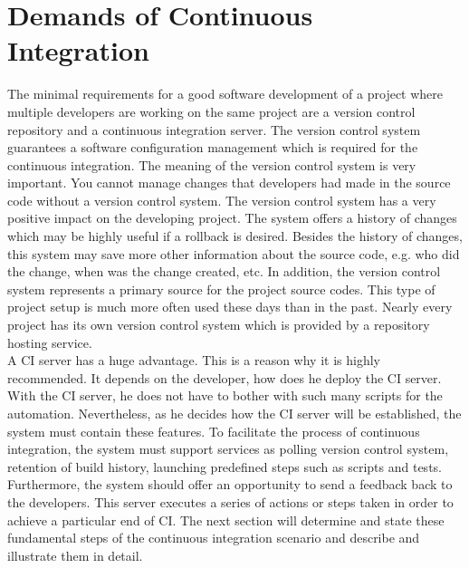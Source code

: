 \section{Demands of Continuous Integration}

The minimal requirements for a good software development of a project where multiple developers are working on the same project are a version control repository and a continuous integration server. The version control system guarantees a software configuration management which is required for the continuous integration. The meaning of the version control system is very important. You cannot manage changes that developers had made in the source code without a version control system. The version control system has a very positive impact on the developing project. The system offers a history of changes which may be highly useful if a rollback is desired. Besides the history of changes, this system may save more other information about the source code, e.g. who did the change, when was the change created, etc. In addition, the version control system represents a primary source for the project source codes. This type of project setup is much more often used these days than in the past. Nearly every project has its own version control system which is provided by a repository hosting service.\\

A CI server has a huge advantage. This is a reason why it is highly recommended. It depends on the developer, how does he deploy the CI server. With the CI server, he does not have to bother with such many scripts for the automation. Nevertheless, as he decides how the CI server will be established, the system must contain these features. To facilitate the process of continuous integration, the system must support services as polling version control system, retention of build history, launching predefined steps such as scripts and tests. Furthermore, the system should offer an opportunity to send a feedback back to the developers. This server executes a series of actions or steps taken in order to achieve a particular end of CI. The next section will determine and state these fundamental steps of the continuous integration scenario and describe and illustrate them in detail.

